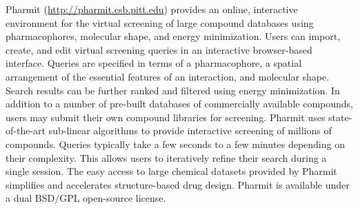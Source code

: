 Pharmit (\url{http://pharmit.csb.pitt.edu}) provides an online, interactive environment for the virtual screening of large compound databases using pharmacophores, molecular shape, and energy minimization.  Users can import, create, and edit virtual screening queries in an interactive browser-based interface.  Queries are specified in terms of a pharmacophore, a spatial arrangement of the essential features of an interaction, and molecular shape.  Search results can be further ranked and filtered using energy minimization.  
In addition to a number of pre-built databases of commercially available compounds, users may submit their own compound libraries for screening.  Pharmit uses state-of-the-art sub-linear algorithms to provide interactive screening of millions of compounds. Queries typically take a few seconds to a few minutes depending on their complexity. This allows users to iteratively refine their search during a single session.  The easy access to large chemical datasets provided by Pharmit simplifies and accelerates structure-based drug design.  Pharmit is available under a dual BSD/GPL open-source license.
